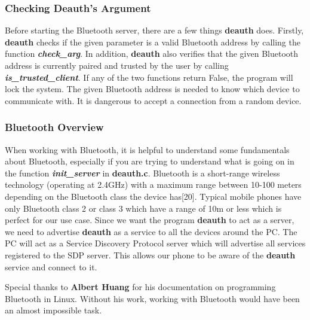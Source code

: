 \documentclass[letterpaper,twocolumn,10pt]{article}
\begin{document}
\subsubsection{Checking Deauth's Argument}
Before starting the Bluetooth server, there are a few things \textbf{deauth} does. Firstly, \textbf{deauth} checks if the given parameter is a valid Bluetooth address by calling the function \textbf{\emph{check\_arg}}. In addition, \textbf{deauth} also verifies that the given Bluetooth address is currently paired and trusted by the user by calling \textbf{\emph{is\_trusted\_client}}. If any of the two functions return False, the program will lock the system. The given Bluetooth address is needed to know which device to communicate with. It is dangerous to accept a connection from a random device.

\subsubsection{Bluetooth Overview} 
When working with Bluetooth, it is helpful to understand some fundamentals about Bluetooth, especially if you are trying to understand what is going on in the function \textbf{\emph{init\_server}} in \textbf{deauth.c}. Bluetooth is a short-range wireless technology (operating at 2.4GHz) with a maximum range between 10-100 meters depending on the Bluetooth class the device has[20]. Typical mobile phones have only Bluetooth class 2 or class 3 which have a range of 10m or less which is perfect for our use case. Since we want the program \textbf{deauth} to act as a server, we need to advertise \textbf{deauth} as a service to all the devices around the PC. The PC will act as a Service Discovery Protocol server which will advertise all services registered to the SDP server. This allows our phone to be aware of the \textbf{deauth} service and connect to it.

Special thanks to \textbf{Albert Huang} for his documentation on programming Bluetooth in Linux. Without his work, working with Bluetooth would have been an almost impossible task.
\end{document}
